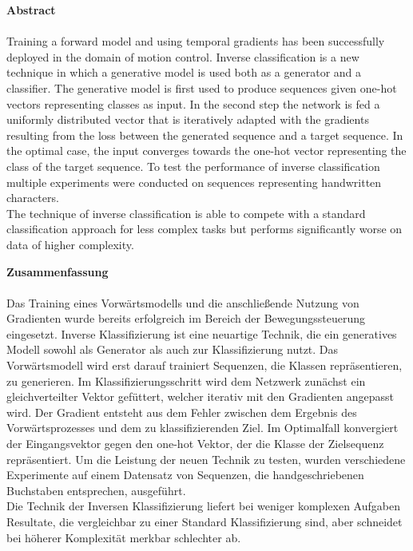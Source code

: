 
\begingroup

\noindent
\textbf{\LARGE Abstract}\\
\parskip 12pt \\
Training a forward model and using temporal gradients has been successfully deployed in the domain of motion control. Inverse classification is a new technique in which a generative model is used both as a generator and a classifier. The generative model is first used to produce sequences given one-hot vectors representing classes as input. In the second step the network is fed a uniformly distributed vector that is iteratively adapted with the gradients resulting from the loss between the generated sequence and a target sequence. In the optimal case, the input converges towards the one-hot vector representing the class of the target sequence. To test the performance of inverse classification multiple experiments were conducted on sequences representing handwritten characters. \\
The technique of inverse classification is able to compete with a standard classification approach for less complex tasks but performs significantly worse on data of higher complexity.
\endgroup

\pagebreak

\begingroup

\noindent
\textbf{\LARGE Zusammenfassung}\\
\parskip 12pt \\
Das Training eines Vorwärtsmodells und die anschließende Nutzung von Gradienten wurde bereits erfolgreich im Bereich der Bewegungssteuerung eingesetzt. Inverse Klassifizierung ist eine neuartige Technik, die ein generatives Modell sowohl als Generator als auch zur Klassifizierung nutzt. Das Vorwärtsmodell wird erst darauf trainiert Sequenzen, die Klassen repräsentieren, zu generieren. Im Klassifizierungsschritt wird dem Netzwerk zunächst ein gleichverteilter Vektor gefüttert, welcher iterativ mit den Gradienten angepasst wird. Der Gradient entsteht aus dem Fehler zwischen dem Ergebnis des Vorwärtsprozesses und dem zu klassifizierenden Ziel. Im Optimalfall konvergiert der Eingangsvektor gegen den one-hot Vektor, der die Klasse der Zielsequenz repräsentiert. Um die Leistung der neuen Technik zu testen, wurden verschiedene Experimente auf einem Datensatz von Sequenzen, die handgeschriebenen Buchstaben entsprechen, ausgeführt.\\
Die Technik der Inversen Klassifizierung liefert bei weniger komplexen Aufgaben Resultate, die vergleichbar zu einer Standard Klassifizierung sind, aber schneidet bei höherer Komplexität merkbar schlechter ab. 
\vspace*{\fill}

\endgroup